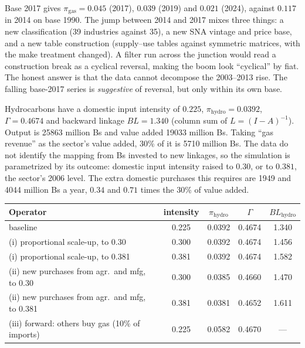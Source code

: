 \documentclass[../solutions_manual.tex]{subfiles}
\begin{document}
 Base 2017 gives $\pi_{\text{gas}} = 0.045$ (2017), $0.039$ (2019) and $0.021$ (2024), against $0.117$ in 2014 on base 1990. The jump between 2014 and 2017 mixes three things: a new classification (39 industries against 35), a new SNA vintage and price base, and a new table construction (supply--use tables against symmetric matrices, with the make treatment changed). A filter run across the junction would read a construction break as a cyclical reversal, making the boom look ``cyclical'' by fiat. The honest answer is that the data cannot decompose the 2003--2013 rise. The falling base-2017 series is \emph{suggestive} of reversal, but only within its own base.


 Hydrocarbons have a domestic input intensity of $0.225$, $\pi_{\text{hydro}} = 0.0392$, $\Gamma = 0.4674$ and backward linkage $BL = 1.340$ (column sum of $L = (I - A)^{-1}$). Output is 25863 million Bs and value added 19033 million Bs. Taking ``gas revenue'' as the sector's value added, 30\% of it is 5710 million Bs. The data do not identify the mapping from Bs invested to new linkages, so the simulation is parametrized by its outcome: domestic input intensity raised to $0.30$, or to $0.381$, the sector's 2006 level. The extra domestic purchases this requires are 1949 and 4044 million Bs a year, $0.34$ and $0.71$ times the 30\% of value added.

\begin{center}\small
{\footnotesize\begin{tabular}{lcccc}
\toprule
Operator & intensity & $\pi_{\text{hydro}}$ & $\Gamma$ & $BL_{\text{hydro}}$ \\
\midrule
baseline & 0.225 & 0.0392 & 0.4674 & 1.340 \\
(i) proportional scale-up, to 0.30 & 0.300 & 0.0392 & 0.4674 & 1.456 \\
(i) proportional scale-up, to 0.381 & 0.381 & 0.0392 & 0.4674 & 1.582 \\
(ii) new purchases from agr.\ and mfg, to 0.30 & 0.300 & 0.0385 & 0.4660 & 1.470 \\
(ii) new purchases from agr.\ and mfg, to 0.381 & 0.381 & 0.0381 & 0.4652 & 1.611 \\
(iii) forward: others buy gas (10\% of imports) & 0.225 & 0.0582 & 0.4670 & --- \\
\bottomrule
\end{tabular}}
\end{center}
\end{document}
